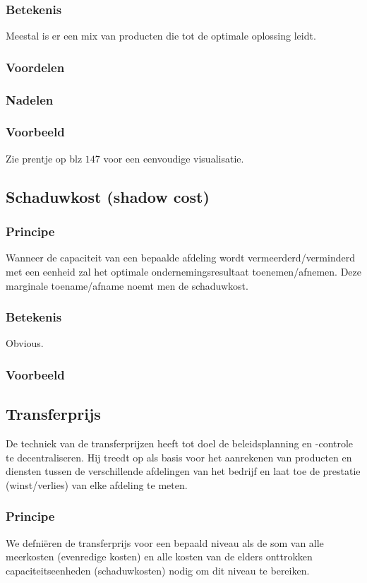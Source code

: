 \documentclass[12pt]{article}
\begin{document}
\subsubsection{Betekenis}
Meestal is er een mix van producten die tot de optimale oplossing leidt.
\subsubsection{Voordelen}
\subsubsection{Nadelen}
\subsubsection{Voorbeeld}
Zie prentje op blz $147$ voor een eenvoudige visualisatie.
\subsection{Schaduwkost (shadow cost)}
\subsubsection{Principe}
Wanneer de capaciteit van een bepaalde afdeling wordt vermeerderd/verminderd met een eenheid zal het optimale ondernemingsresultaat toenemen/afnemen. Deze marginale toename/afname noemt men de schaduwkost.
\subsubsection{Betekenis}
Obvious.
\subsubsection{Voorbeeld}
\subsection{Transferprijs}
De techniek van de transferprijzen heeft tot doel de beleidsplanning en -controle te decentraliseren. Hij treedt op als basis voor het aanrekenen van producten en diensten tussen de verschillende afdelingen van het bedrijf en laat toe de prestatie (winst/verlies) van elke afdeling te meten.
\subsubsection{Principe}
We defni\"eren de transferprijs voor een bepaald niveau als de som van alle meerkosten (evenredige kosten) en alle kosten van de elders onttrokken capaciteitseenheden (schaduwkosten) nodig om dit niveau te bereiken.
\end{document}
